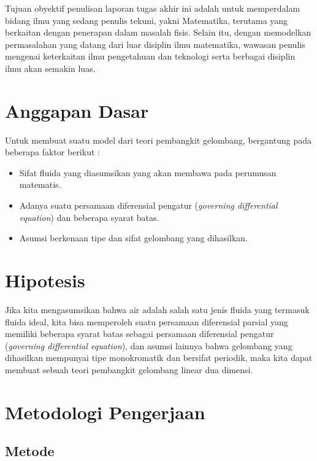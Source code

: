 \documentclass[12pt,a4paper]{report}
\begin{document}
Tujuan obyektif penulisan laporan tugas akhir ini adalah untuk memperdalam
bidang ilmu yang sedang penulis tekuni, yakni Matematika, terutama yang
berkaitan dengan penerapan dalam masalah fisis. Selain itu, dengan
memodelkan permasalahan yang datang dari luar disiplin ilmu matematika,
wawasan penulis mengenai keterkaitan ilmu pengetahuan dan teknologi serta
berbagai disiplin ilmu akan semakin luas.\newline

\section{Anggapan Dasar}

Untuk membuat suatu model dari teori pembangkit gelombang, bergantung pada
beberapa faktor berikut :

\begin{itemize}
\item  Sifat fluida yang diasumsikan yang akan membawa pada perumusan
matematis.

\item  Adanya suatu persamaan diferensial pengatur (\textit{governing
differential equation}) dan beberapa syarat batas.

\item  Asumsi berkenaan tipe dan sifat gelombang yang dihasilkan.
\end{itemize}

\section{Hipotesis}

Jika kita mengasumsikan bahwa air adalah salah satu jenis fluida yang
termasuk fluida ideal, kita bisa memperoleh suatu persamaan diferensial
parsial yang memiliki beberapa syarat batas sebagai persamaan diferensial
pengatur (\textit{governing differential equation}), dan asumsi lainnya
bahwa gelombang yang dihasilkan mempunyai tipe monokromatik dan bersifat
periodik, maka kita dapat membuat sebuah teori pembangkit gelombang linear
dua dimensi. \newline

\section{Metodologi Pengerjaan}

\subsection{Metode}
\end{document}
